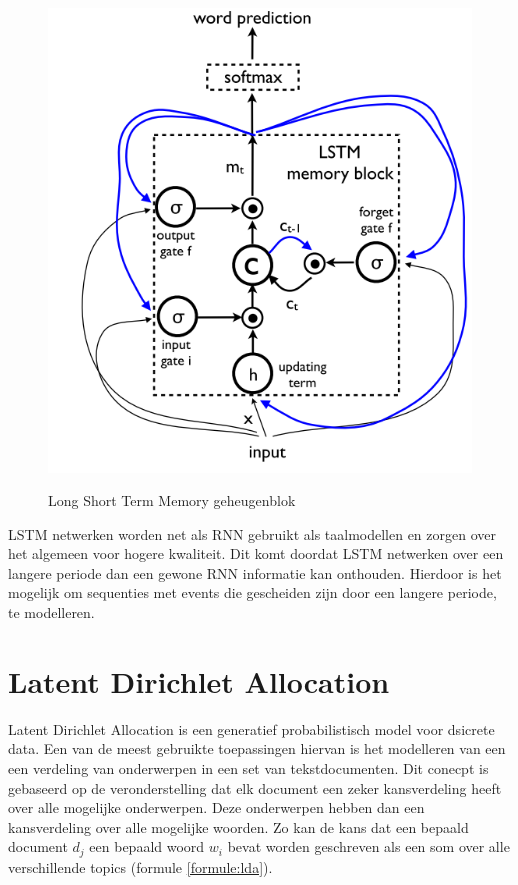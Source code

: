\begin{figure}[tb]
    \centering
    \includegraphics[width=\linewidth]{Images/lstm.PNG}
    \label{fig:lstm}
    \caption{Long Short Term Memory geheugenblok}
\end{figure}

LSTM netwerken worden net als RNN gebruikt als taalmodellen en zorgen over het algemeen voor hogere kwaliteit. Dit komt doordat LSTM netwerken over een langere periode dan een gewone RNN informatie kan onthouden. Hierdoor is het mogelijk om sequenties met events die gescheiden zijn door een langere periode, te modelleren. 

\section{Latent Dirichlet Allocation}
Latent Dirichlet Allocation is een generatief probabilistisch model voor dsicrete data. Een van de meest gebruikte toepassingen hiervan is het modelleren van een een verdeling van onderwerpen in een set van tekstdocumenten. Dit conecpt is gebaseerd op de veronderstelling dat elk document een zeker kansverdeling heeft over alle mogelijke onderwerpen. Deze onderwerpen hebben dan een kansverdeling over alle mogelijke woorden. Zo kan de kans dat een bepaald document $d_j$ een bepaald woord $w_i$ bevat worden geschreven als een som over alle verschillende topics (formule \ref{formule:lda}). 

